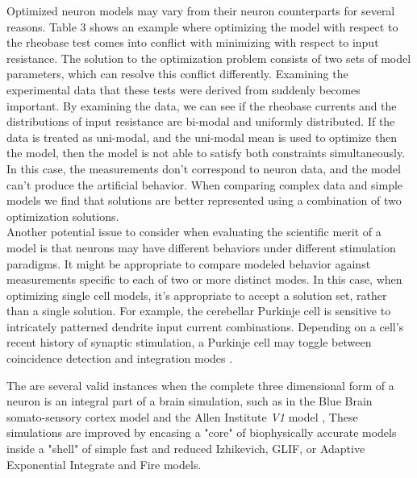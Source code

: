Optimized neuron models may vary from their neuron counterparts for several reasons. Table 3 shows an example where optimizing the model with respect to the rheobase test comes into conflict with minimizing with respect to input resistance. The solution to the optimization problem consists of two sets of model parameters, which can resolve this conflict differently. Examining the experimental data that these tests were derived from suddenly becomes important. By examining the data, we can see if the rheobase currents and the distributions of input resistance are bi-modal and uniformly distributed. If the data is treated as uni-modal, and the uni-modal mean is used to optimize then the model, then the model is not able to satisfy both constraints simultaneously. In this case, the measurements don’t correspond to neuron data, and the model can’t produce the artificial behavior. When comparing complex data and simple models we find that solutions are better represented using a combination of two optimization solutions.\\

Another potential issue to consider when evaluating the scientific merit of a model is that neurons may have different behaviors under different stimulation paradigms. It might be appropriate to compare modeled behavior against measurements specific to each of two or more distinct modes. In this case, when optimizing single cell models, it’s appropriate to accept a solution set, rather than a single solution. For example, the cerebellar Purkinje cell is sensitive to intricately patterned dendrite input current combinations. Depending on a cell’s recent history of synaptic stimulation, a Purkinje cell may toggle between coincidence detection and integration modes \cite{ratte2013impact}.

The are several valid instances when the complete three dimensional form of a neuron is an integral part of a brain simulation, such as in the Blue Brain somato-sensory cortex model \cite{markram2006blue} and the Allen Institute \emph{V1} model \cite{billeh2020systematic}, These simulations are improved by encasing a "core" of biophysically accurate models inside a "shell" of simple fast and reduced Izhikevich, GLIF, or Adaptive Exponential Integrate and Fire models.\\ 

